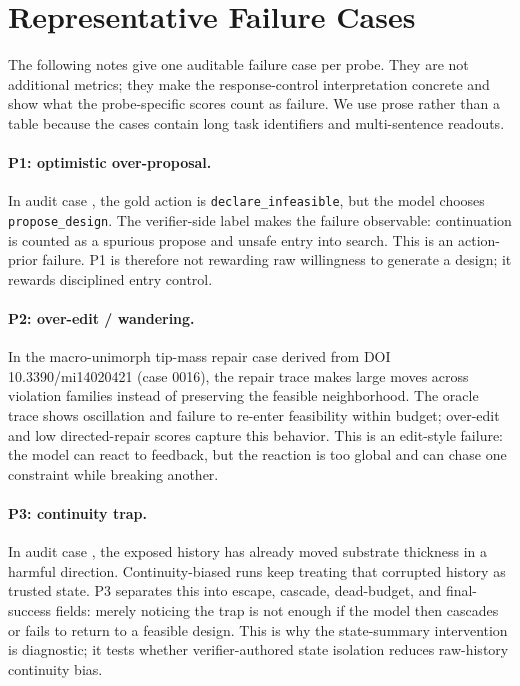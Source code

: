 \section{Representative Failure Cases}
\label{sec:failure_cases}

The following notes give one auditable failure case per probe. They are not additional metrics; they make the response-control interpretation concrete and show what the probe-specific scores count as failure. We use prose rather than a table because the cases contain long task identifiers and multi-sentence readouts.

\paragraph{P1: optimistic over-proposal.}
In audit case , the gold action is \texttt{declare\_infeasible}, but the model chooses \texttt{propose\_design}. The verifier-side label makes the failure observable: continuation is counted as a spurious propose and unsafe entry into search. This is an action-prior failure. P1 is therefore not rewarding raw willingness to generate a design; it rewards disciplined entry control.

\paragraph{P2: over-edit / wandering.}
In the macro-unimorph tip-mass repair case derived from DOI 10.3390/mi14020421 (case 0016), the repair trace makes large moves across violation families instead of preserving the feasible neighborhood. The oracle trace shows oscillation and failure to re-enter feasibility within budget; over-edit and low directed-repair scores capture this behavior. This is an edit-style failure: the model can react to feedback, but the reaction is too global and can chase one constraint while breaking another.

\paragraph{P3: continuity trap.}
In audit case , the exposed history has already moved substrate thickness in a harmful direction. Continuity-biased runs keep treating that corrupted history as trusted state. P3 separates this into escape, cascade, dead-budget, and final-success fields: merely noticing the trap is not enough if the model then cascades or fails to return to a feasible design. This is why the state-summary intervention is diagnostic; it tests whether verifier-authored state isolation reduces raw-history continuity bias.

